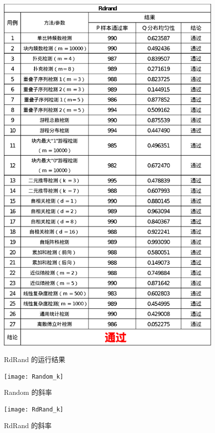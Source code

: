 \documentclass[12pt,a4paper]{article}%
\begin{document}
\begin{figure}[h]
\begin{minipage}{0.42\textwidth}
        \includegraphics[width=\linewidth]{RdRand}
        \caption{RdRand 的运行结果}
        \label{fig:img5}
    \end{minipage}\hfill
    \begin{minipage}{0.42\textwidth}
        \centering
        \texttt{[image: Random\_k]}
        \caption{Random 的斜率}
        \label{fig:img6}
    \end{minipage}\hfill
    \begin{minipage}{0.42\textwidth}
        \centering
        \texttt{[image: RdRand\_k]}
        \caption{RdRand 的斜率}
        \label{fig:img7}
    \end{minipage}
\end{figure}
\end{document}
